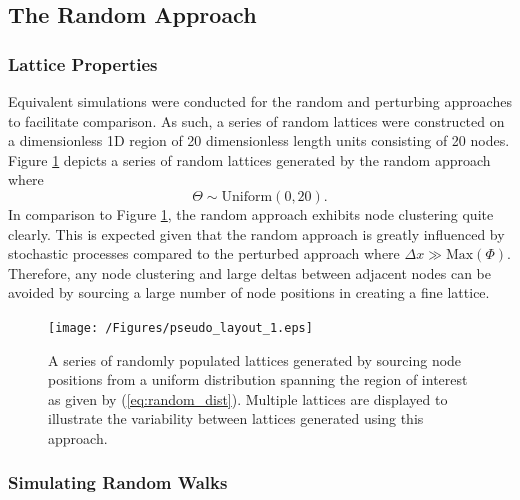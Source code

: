 \documentclass[11pt,titlepage,a4paper]{article}
\begin{document}


	\subsection{The Random Approach}
		\label{sub:therandomapproach}
		
		\subsubsection{Lattice Properties}
			\label{subs:latticeproperties_random}
			
			Equivalent simulations were conducted for the random and perturbing approaches to facilitate comparison. As such, a series of random lattices were constructed on a dimensionless 1D region of 20 dimensionless length units consisting of 20 nodes. Figure \ref{fig:pseudo_layout_1} depicts a series of random lattices generated by the random approach where
			\begin{equation}
				\label{eq:random_dist}
				\Theta \sim \text{Uniform} \left(0, 20\right).	
			\end{equation}
			In comparison to Figure \ref{fig:pseudo_layout_1}, the random approach exhibits node clustering quite clearly. This is expected given that the random approach is greatly influenced by stochastic processes compared to the perturbed approach where $\Delta x \gg \text{Max} \left(\Phi \right)$. Therefore, any node clustering and large deltas between adjacent nodes can be avoided by sourcing a large number of node positions in creating a fine lattice.

			\begin{figure}[tbh]
				\centering
					\texttt{[image: /Figures/pseudo\_layout\_1.eps]}
				\caption{A series of randomly populated lattices generated by sourcing node positions from a uniform distribution spanning the region of interest as given by (\ref{eq:random_dist}). Multiple lattices are displayed to illustrate the variability between lattices generated using this approach.}
				\label{fig:pseudo_layout_1}
			\end{figure}


		\subsubsection{Simulating Random Walks}
		\label{sub:simulatingrandomwalks_random}
			
\end{document}
